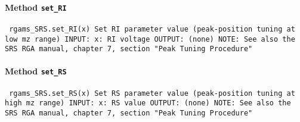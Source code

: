 \paragraph{Method \texttt{set_RI}}
\vspace{1ex}
\texttt{\newline
rgams_SRS.set_RI(x)\newline
\newline
Set RI parameter value (peak-position tuning at low mz range)\newline
\newline
INPUT:\newline
x: RI voltage\newline
\newline
OUTPUT:\newline
(none)\newline
\newline
NOTE:\newline
See also the SRS RGA manual, chapter 7, section "Peak Tuning Procedure"\newline
\newline
}

\paragraph{Method \texttt{set_RS}}
\vspace{1ex}
\texttt{\newline
rgams_SRS.set_RS(x)\newline
\newline
Set RS parameter value (peak-position tuning at high mz range)\newline
\newline
INPUT:\newline
x: RS value\newline
\newline
OUTPUT:\newline
(none)\newline
\newline
NOTE:\newline
See also the SRS RGA manual, chapter 7, section "Peak Tuning Procedure"\newline
\newline
}

